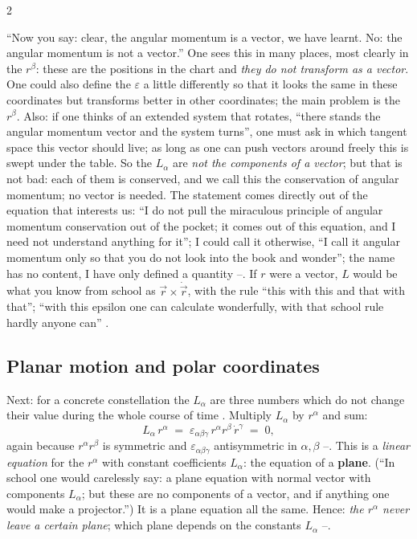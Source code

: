 \begin{paracol}{2}
\begin{coursenote}\label{cn:tb-Lvec}
``Now you say: clear, the angular momentum is a vector, we have learnt. No: the angular momentum is not a vector.'' One sees this in many places, most clearly in the $r^\beta$: these are the positions in the chart and \emph{they do not transform as a vector}. One could also define the $\varepsilon$ a little differently so that it looks the same in these coordinates but transforms better in other coordinates; the main problem is the $r^\beta$.
Also: if one thinks of an extended system that rotates, ``there stands the angular momentum vector and the system turns'', one must ask in which tangent space this vector should live; as long as one can push vectors around freely this is swept under the table. So the $L_\alpha$ are \emph{not the components of a vector}; but that is not bad: each of them is conserved, and we call this the conservation of angular momentum;
no vector is needed. The statement comes directly out of the equation that interests us: ``I do not pull the miraculous principle of angular momentum conservation out of the pocket; it comes out of this equation, and I need not understand anything for it''; I could call it otherwise, ``I call it angular momentum only so that you do not look into the book and wonder''; the name has no content, I have only defined a quantity --.
If $r$ were a vector, $L$ would be what you know from school as $\vec r\times\dot{\vec r}$, with the rule ``this with this and that with that''; ``with this epsilon one can calculate wonderfully, with that school rule hardly anyone can'' .
\end{coursenote}

\subsection{Planar motion and polar coordinates}\label{ssec:tb-plane}

Next: for a concrete constellation the $L_\alpha$ are three numbers which do not change their value during the whole course of time . Multiply $L_\alpha$ by $r^\alpha$ and sum:
\begin{equation}\label{eq:tb-plane}
  L_\alpha\,r^\alpha\;=\;\varepsilon_{\alpha\beta\gamma}\,r^\alpha r^\beta\,\dot r^\gamma\;=\;0,
\end{equation}
again because $r^\alpha r^\beta$ is symmetric and $\varepsilon_{\alpha\beta\gamma}$ antisymmetric in $\alpha,\beta$ --.
This is a \emph{linear equation} for the $r^\alpha$ with constant coefficients $L_\alpha$: the equation of a \textbf{plane}. (``In school one would carelessly say: a plane equation with normal vector with components $L_\alpha$; but these are no components of a vector, and if anything one would make a projector.'') It is a plane equation all the same. Hence: \emph{the $r^\alpha$ never leave a certain plane}; which plane depends on the constants $L_\alpha$ --.


\end{paracol}

